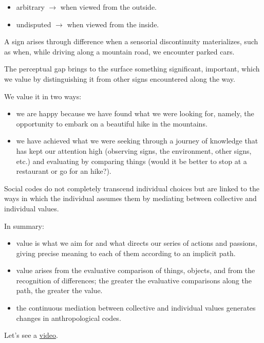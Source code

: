 \begin{itemize}
\tightlist
\item arbitrary \(\rightarrow\) when viewed from the outside.
\item undisputed \(\rightarrow\) when viewed from the inside.
\end{itemize}

A sign arises through difference when a sensorial discontinuity materializes, such as when, while driving along a mountain road, we encounter parked cars.

The perceptual gap brings to the surface something significant, important, which we value by distinguishing it from other signs encountered along the way.

We value it in two ways:

\begin{itemize}
\tightlist
\item we are happy because we have found what we were looking for, namely, the opportunity to embark on a beautiful hike in the mountains.
\item we have achieved what we were seeking through a journey of knowledge that has kept our attention high (observing signs, the environment, other signs, etc.) and evaluating by comparing things (would it be better to stop at a restaurant or go for an hike?).
\end{itemize}

Social codes do not completely transcend individual choices but are linked to the ways in which the individual assumes them by mediating between collective and individual values.

In summary:

\begin{itemize}
\tightlist
\item value is what we aim for and what directs our series of actions and passions, giving precise meaning to each of them according to an implicit path.
\item value arises from the evaluative comparison of things, objects, and from the recognition of differences; the greater the evaluative comparisons along the path, the greater the value.
\item the continuous mediation between collective and individual values \hspace{0pt}\hspace{0pt}generates changes in anthropological codes.
\end{itemize}

Let's see a \href{http://www.musicaecodice.it/gitmedia/emc/1_media/sordi1.mp4}{video}.

